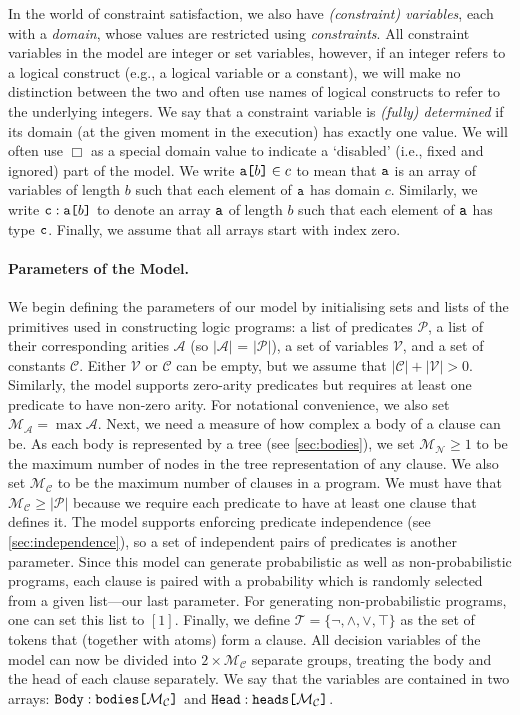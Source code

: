 \documentclass[runningheads]{llncs}
\newcommand{\variable}[1]{\texttt{\textup{#1}}}
\newcommand{\arrayd}[3]{\variable{{#1}[}{#2}\variable{]} \in {#3}}
\newcommand{\arrayt}[3]{\variable{{#3}} : \variable{{#1}[}{#2}\variable{]}}
\newcommand{\predicates}{\mathcal{P}}
\newcommand{\variables}{\mathcal{V}}
\newcommand{\constants}{\mathcal{C}}
\newcommand{\tokens}{\mathcal{T}}
\newcommand{\arities}{\mathcal{A}}
\newcommand{\maxArity}{\mathcal{M}_{\mathcal{A}}}
\newcommand{\maxNumNodes}{\mathcal{M}_{\mathcal{N}}}
\newcommand{\maxNumClauses}{\mathcal{M}_{\mathcal{C}}}
\begin{document}
In the world of constraint satisfaction, we also have \emph{(constraint)
  variables}, each with a \emph{domain}, whose values are restricted using
\emph{constraints}. All constraint variables in the model are integer or set
variables, however, if an integer refers to a logical construct
(e.g., a logical variable or a constant), we will make no distinction between
the two and often use names of logical constructs to refer to the underlying
integers. We say that a constraint variable is \emph{(fully) determined} if its
domain (at the given moment in the execution) has exactly one value. We will
often use $\Box$ as a special domain value to indicate a `disabled' (i.e., fixed
and ignored) part of the model. We write $\arrayd{a}{b}{c}$ to mean that
$\variable{a}$ is an array of variables of length $b$ such that each element of
$\variable{a}$ has domain $c$. Similarly, we write $\arrayt{a}{b}{c}$ to denote
an array $\variable{a}$ of length $b$ such that each element of $\variable{a}$
has type $\variable{c}$. Finally, we assume that all arrays start with index
zero.

\paragraph{Parameters of the Model.} We begin defining the parameters of our
model by initialising sets and lists of the primitives used in constructing
logic programs: a list of predicates $\predicates{}$, a list of their
corresponding arities $\arities{}$ (so $|\arities{}|$ = $|\predicates{}|$), a
set of variables $\variables{}$, and a set of constants $\constants{}$. Either
$\variables{}$ or $\constants{}$ can be empty, but we assume that
$|\constants{}| + |\variables{}| > 0$. Similarly, the model supports zero-arity
predicates but requires at least one predicate to have non-zero arity. For
notational convenience, we also set $\maxArity{} = \max \arities{}$. Next, we
need a measure of how complex a body of a clause can be. As each body is
represented by a tree (see \cref{sec:bodies}), we set $\maxNumNodes{} \ge 1$ to
be the maximum number of nodes in the tree representation of any clause. We also
set $\maxNumClauses{}$ to be the maximum number of clauses in a program. We must
have that $\maxNumClauses{} \ge |\predicates{}|$ because we require each
predicate to have at least one clause that defines it. The model supports
enforcing predicate independence (see \cref{sec:independence}), so a set of
independent pairs of predicates is another parameter. Since this model can
generate probabilistic as well as non-probabilistic programs, each clause is
paired with a probability which is randomly selected from a given list---our
last parameter. For generating non-probabilistic programs, one can set this list
to $[1]$. Finally, we define $\tokens{} = \{ \neg, \land, \lor, \top \}$ as the
set of tokens that (together with atoms) form a clause. All decision variables
of the model can now be divided into $2 \times \maxNumClauses{}$ separate
groups, treating the body and the head of each clause separately. We say that
the variables are contained in two arrays:
$\arrayt{bodies}{\maxNumClauses{}}{Body}$ and
$\arrayt{heads}{\maxNumClauses{}}{Head}$.
\end{document}
